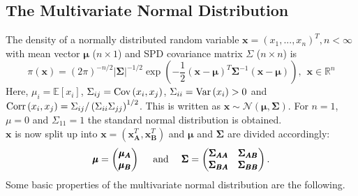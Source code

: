 \documentclass[12pt]{book}
\begin{document}
\subsection{The Multivariate Normal Distribution}
The density of a normally distributed random variable $\pmb{x}=\left(x_1,...,x_n\right)^T, n<\infty$ with mean vector $\pmb{\mu}$ ($n\times1$) and SPD covariance matrix $\Sigma$ ($n\times n$) is
\begin{equation}
    \pi\left(\pmb{x}\right)=\left(2\pi\right)^{-n/2}|\pmb{\Sigma}|^{-1/2}\exp\left(-\frac{1}{2}\left(\pmb{x}-\pmb{\mu}\right)^T\pmb{\Sigma}^{-1}\left(\pmb{x}-\pmb{\mu}\right)\right),\hspace{5pt}\pmb{x}\in\mathbb{R}^n
\end{equation}
Here, $\mu_i=\mathbb{E}\left[x_i\right]$, $ \Sigma_{ij}=\hbox{Cov}\left(x_i,x_j\right)$, $ \Sigma_{ii}=\hbox{Var}\left(x_i\right) > 0$ and $\hbox{Corr}\left(x_i,x_j\right)=\Sigma_{ij}/\left(\Sigma_{ii}\Sigma_{jj}\right)^{1/2}$. This is written as $\pmb{x}\sim\mathcal{N}\left(\pmb{\mu},\pmb{\Sigma}\right)$. For $n=1$, $\mu=0$ and $\Sigma_{11}=1$ the standard normal distribution is obtained. \\
$\pmb{x}$ is now split up into $\pmb{x}=\left(\pmb{x}_{\pmb{A}}^T,\pmb{x}_{\pmb{B}}^T\right)$ and $\pmb{\mu}$ and $\pmb{\Sigma}$ are divided accordingly:
\begin{equation*}
    \pmb{\mu} = \begin{pmatrix}\pmb{\mu}_{\pmb{A}} \\ \pmb{\mu}_{\pmb{B}}\end{pmatrix} \hspace{10pt}\hbox{ and }\hspace{10pt} \pmb{\Sigma}=\begin{pmatrix}\pmb{\Sigma}_{\pmb{AA}} & \pmb{\Sigma}_{\pmb{AB}}\\\pmb{\Sigma}_{\pmb{BA}} & \pmb{\Sigma}_{\pmb{BB}}\end{pmatrix}.
\end{equation*}
Some basic properties of the multivariate normal distribution are the following.
\end{document}
